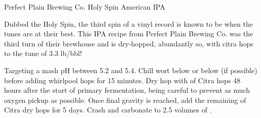 \begin{recipie}{Perfect Plain Brewing Co. Holy Spin American IPA}

\begin{aboutblock}
Dubbed the Holy Spin, the third spin of a vinyl record is known to be when the tunes
are at their best. This IPA recipe from Perfect Plain Brewing Co. was the third turn
of their brewhouse and is dry-hopped, abundantly so, with citra hops to the tune
of 3.3 lb/bbl!
\end{aboutblock}


\begin{methodandtiming}
 
\begin{mashsteps}
\end{mashsteps}

\begin{directions}
Targeting a mash pH between 5.2 and 5.4. Chill wort below  or below (if possible)
before adding whirlpool hops for 15 minutes. Dry hop with  of Citra hops 48 hours
after the start of primary fermentation, being careful to prevent as much oxygen pickup as
possible. Once final gravity is reached, add the remaining  of Citra dry hops for
5 days. Crash and carbonate to 2.5 volumes of .
\end{directions}

\end{methodandtiming}

\pagebreak

\begin{ingredientsblock}

\begin{malts}
\end{malts}

\begin{hops}
\end{hops}

\begin{yeasts}
\end{yeasts}

\end{ingredientsblock}

\end{recipie}

